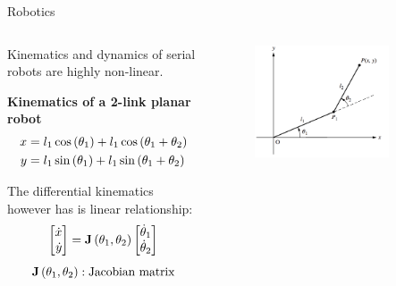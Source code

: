 \documentclass[aspectratio=169]{beamer}
\def\mf{\ensuremath\mathbf}
\def\lp{\ensuremath\left(}
\def\rp{\ensuremath\right)}
\def\bmx{\ensuremath\begin{bmatrix*}[r]}
\def\emx{\ensuremath\end{bmatrix*}}
\newcommand{\ct}[1]{\lp #1\rp}
\begin{document}
\begin{frame}{Robotics}
  \begin{columns}
    \begin{column}{0.5\textwidth}
      Kinematics and dynamics of serial robots are highly non-linear.

      \textbf{Kinematics of a 2-link planar robot}
      \[ 
        \begin{split}
          x &= l_1 \cos\ct{\theta_1} + l_1 \cos\ct{\theta_1 + \theta_2} \\
          y &= l_1 \sin\ct{\theta_1} + l_1 \sin\ct{\theta_1 + \theta_2} \\
        \end{split}
      \]

      The differential kinematics however has is linear relationship:
      \[ \bmx \dot{x} \\ \dot{y}\emx = \mf{J}\ct{\theta_1, \theta_2} \bmx \dot{\theta}_1 \\ \dot{\theta}_2 \emx \]
      \[ \mf{J}\ct{\theta_1, \theta_2}: \text{Jacobian matrix} \]
    \end{column}
    \begin{column}{0.45\textwidth}
      \begin{figure}
        \centering
        \includegraphics[width=0.8\textwidth]{2links.png}
      \end{figure}
    \end{column}    
  \end{columns}
\end{frame}
\end{document}
